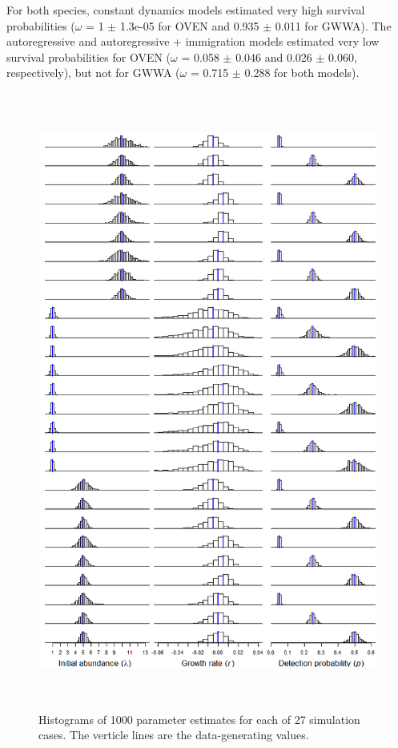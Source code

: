 \documentclass[12pt]{article}
\begin{document}
For both species, constant dynamics models estimated very high
survival probabilities ($\omega$ = 1 $\pm$ 1.3e-05 for OVEN and 0.935 $\pm$ 0.011 for
GWWA).   The autoregressive and autoregressive + immigration models
estimated very low survival probabilities for OVEN ($\omega$ = 0.058 $\pm$ 0.046
and 0.026 $\pm$ 0.060, respectively), but not for GWWA ($\omega$ = 0.715 $\pm$ 0.288
for both models).



\begin{figure}
  \centering
  \includegraphics[height=8in]{figs/exp_hists}
  \caption{Histograms of 1000 parameter estimates for each of 27 simulation cases. The verticle lines are the data-generating values.}
\label{fig:exp_hists}
\end{figure}
\end{document}
